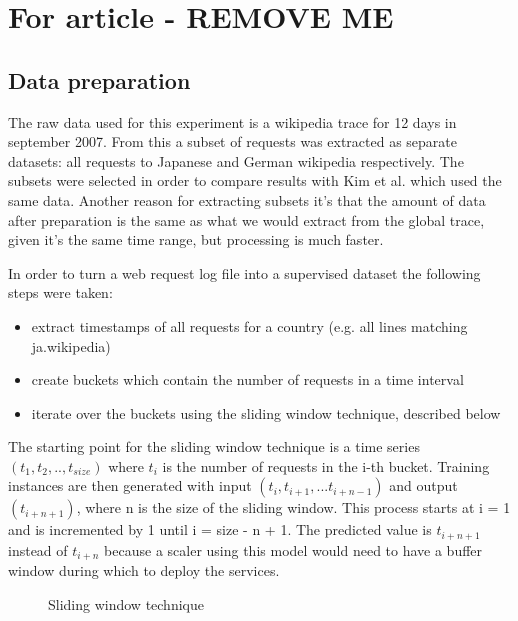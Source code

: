 \documentclass[12pt]{article}
\begin{document}
  \section{For article - REMOVE ME}
  \subsection{Data preparation}
  The raw data used for this experiment is a wikipedia trace for 12 days in september 2007\cite{wikidata}. From this a subset of requests was extracted as separate datasets: all requests to Japanese and German wikipedia respectively. 
The subsets were selected in order to compare results with Kim et al.\cite{CloudInsight} which used the same data. Another reason for extracting subsets it's that the amount of data after preparation is the same as what we would extract from the global trace, given it's the same time range,
but processing is much faster.

In order to turn a web request log file into a supervised dataset the following steps were taken: 
\begin{itemize}
\item extract timestamps of all requests for a country (e.g. all lines matching ja.wikipedia)
\item create buckets which contain the number of requests in a time interval
\item iterate over the buckets using the sliding window technique, described below
\end{itemize}

The starting point for the sliding window technique\cite{sliding_window} is a time series $(t_1, t_2, .., t_{size})$ where $t_i$ is the number of requests in the i-th bucket. Training instances are then generated with input $(t_{i}, t_{i+1}, ... t_{i+n-1})$ and output $(t_{i+n+1})$, where n is the size of the sliding window. This process starts at i = 1 and is incremented by 1 until i = size - n + 1. The predicted value is $t_{i+n+1}$ instead of $t_{i+n}$ because a scaler using this model would need to have a buffer window during which to deploy the services.

\begin{figure}
  \caption{Sliding window technique}
  \label{fig:sliding_window}
\end{figure}
\end{document}
